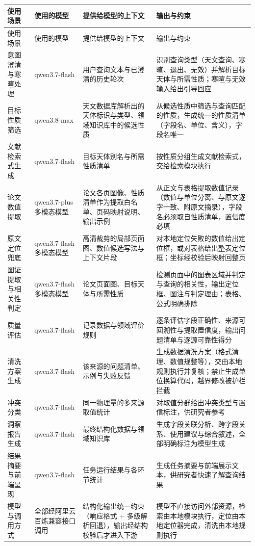\begin{longtable}{@{}p{2.4cm}p{2.6cm}p{4.6cm}p{4.9cm}@{}}
\toprule
使用场景 & 使用的模型 & 提供给模型的上下文 & 输出与约束 \\
\midrule
\endfirsthead
\toprule
使用场景 & 使用的模型 & 提供给模型的上下文 & 输出与约束 \\
\midrule
\endhead
意图澄清与寒暄处理 & qwen3.7-flash & 用户查询文本与已澄清的历史轮次 & 识别查询类型（天文查询、寒暄、退出、无效）并解析目标天体与所需性质；寒暄与无效输入给出引导回应 \\
目标性质筛选 & qwen3.8-max & 天文数据库解析出的天体标识与类型、领域知识库中的候选性质 & 从候选性质中筛选与查询匹配的性质，生成统一的性质清单（字段名、单位、含义），字段名唯一 \\
文献检索式生成 & qwen3.7-flash & 目标天体别名与所需性质清单 & 按性质分组生成文献检索式，交给检索模块执行 \\
论文数值提取 & qwen3.7-plus 多模态模型 & 论文各页图像、性质清单作为提取白名单、页码映射说明、输出示例 & 从正文与表格提取数值记录（数值与单位分离、与原文逐字一致、附原文摘录），字段名必须取自性质清单，置信度必填 \\
原文定位兜底 & qwen3.7-flash 多模态模型 & 高清裁剪的局部页面图、数值候选写法与上下文片段 & 对本地定位失败的数值给出定位框，或对表格给出整表定位框；坐标经校验后映射回整页 \\
图证提取与相关性判定 & qwen3.7-flash 多模态模型 & 论文页面图、目标天体与所需性质 & 检测页面中的图表区域并判定与查询的相关性，输出定位框、图注与判定理由；表格、公式明确排除 \\
质量评估 & qwen3.7-flash & 记录数据与领域评价规则 & 逐条评估字段正确性、来源可回溯性与提取置信度，输出问题清单与逐源可靠性得分 \\
清洗方案生成 & qwen3.7-flash & 该来源的问题清单、示例与失败反馈 & 生成数据清洗方案（格式清理、数值规整等），交由本地规则执行并复核；禁止生成单位换算代码，越界修改被护栏拦截 \\
冲突分类 & qwen3.7-flash & 同一物理量的多来源取值统计 & 对取值分群给出冲突类型与置信标注，供研究者参考 \\
洞察报告生成 & qwen3.7-flash & 最终结构化数据与领域知识库 & 生成字段关联分析、跨字段关系、使用建议与综合叙述，全部明确标注为模型生成 \\
结果摘要与前端呈现 & qwen3.7-flash & 任务运行结果与各环节统计 & 生成任务摘要与前端展示文本，供研究者快速了解查询结果 \\
模型与调用方式 & 全部经阿里云百炼兼容接口调用 & 结构化输出统一约束（响应格式 + 多级解析回退），输出经结构校验后才进入下游 & 模型不直接访问外部资源，检索由本地模块执行，定位由本地定位器完成，清洗由本地规则执行 \\
\bottomrule
\end{longtable}

